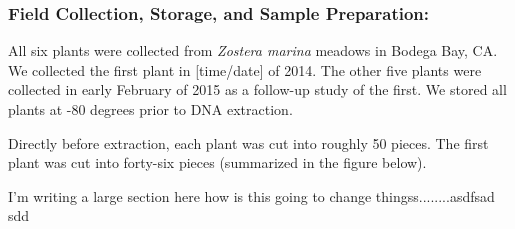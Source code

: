 
\subsubsection{Field Collection, Storage, and Sample Preparation:}

All six plants were collected from \textit{Zostera marina} meadows in Bodega Bay, CA. We collected the first plant in [time/date] of 2014. The other five plants were collected in early February of 2015 as a follow-up study of the first. We stored all plants at -80 degrees prior to DNA extraction. 

Directly before extraction, each plant was cut into roughly 50 pieces. The first plant was cut into forty-six pieces (summarized in the figure below). 

I'm writing a large section here how is this going to change thingss........asdfsad sdd 
    